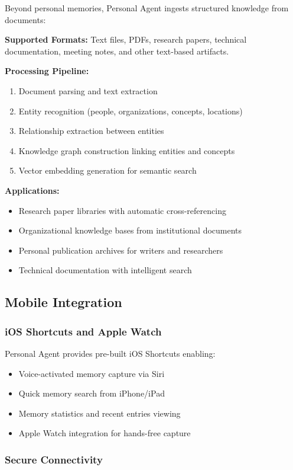 \documentclass[11pt,letterpaper]{article}
\begin{document}
Beyond personal memories, Personal Agent ingests structured knowledge from documents:

\textbf{Supported Formats:} Text files, PDFs, research papers, technical documentation, meeting notes, and other text-based artifacts.

\textbf{Processing Pipeline:}
\begin{enumerate}
\item Document parsing and text extraction
\item Entity recognition (people, organizations, concepts, locations)
\item Relationship extraction between entities
\item Knowledge graph construction linking entities and concepts
\item Vector embedding generation for semantic search
\end{enumerate}

\textbf{Applications:}
\begin{itemize}
\item Research paper libraries with automatic cross-referencing
\item Organizational knowledge bases from institutional documents
\item Personal publication archives for writers and researchers
\item Technical documentation with intelligent search
\end{itemize}

\subsection{Mobile Integration}

\subsubsection{iOS Shortcuts and Apple Watch}

Personal Agent provides pre-built iOS Shortcuts enabling:
\begin{itemize}
\item Voice-activated memory capture via Siri
\item Quick memory search from iPhone/iPad
\item Memory statistics and recent entries viewing
\item Apple Watch integration for hands-free capture
\end{itemize}

\subsubsection{Secure Connectivity}
\end{document}
